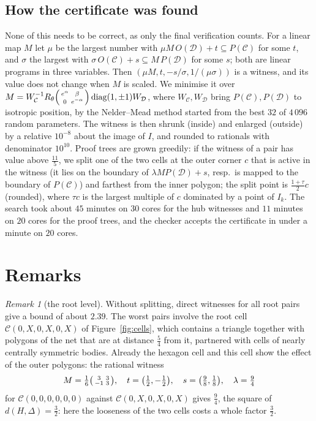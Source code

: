\documentclass[11pt]{amsart}
\theoremstyle{definition}
\theoremstyle{remark}
\newtheorem{remark}[theorem]{Remark}
\newcommand{\dBM}{d}
\newcommand{\C}{\mathcal C}
\newcommand{\D}{\mathcal D}
\begin{document}
\subsection{How the certificate was found}
None of this needs to be correct, as only the final verification counts. For a linear map $M$ let $\mu$ be the largest number
with $\mu M\,O(\D)+t\subseteq P(\C)$ for some $t$, and $\sigma$ the largest with $\sigma\,O(\C)+s\subseteq M\,P(\D)$ for some
$s$; both are linear programs in three variables. Then $(\mu M,t,-s/\sigma,1/(\mu\sigma))$ is a witness, and its value does not
change when $M$ is scaled. We minimise it over $M=W_\C^{-1}R_\theta\begin{psmallmatrix}e^\alpha&\beta\\0&e^{-\alpha}\end{psmallmatrix}
\operatorname{diag}(1,\pm1)W_\D$, where $W_\C,W_\D$ bring $P(\C),P(\D)$ to isotropic position, by the Nelder--Mead method started
from the best $32$ of $4\,096$ random parameters. The witness is then shrunk (inside) and enlarged (outside) by a relative
$10^{-8}$ about the image of $I$, and rounded to rationals with denominator $10^{10}$. Proof trees are grown greedily: if the witness
of a pair has value above $\frac{11}5$, we split one of the two cells at the outer corner $c$ that is active in the witness
(it lies on the boundary of $\lambda MP(\D)+s$, resp.\ is mapped to the boundary of $P(\C)$) and farthest from the inner
polygon; the split point is $\frac{1+\tau}2c$ (rounded), where $\tau c$ is the largest multiple of $c$ dominated by a point
of $I_k$. The search took about $45$ minutes on $30$ cores for the hub witnesses and $11$ minutes on $20$ cores for the proof trees, and the checker accepts the certificate in under a minute on $20$ cores.

\section{Remarks}

\begin{remark}[the root level]
Without splitting, direct witnesses for all root pairs give a bound of about $2.39$. The worst pairs involve the root cell
$\C(0,X,0,X,0,X)$ of Figure~\ref{fig:cells}, which contains a triangle together with polygons of the net that are at distance
$\frac54$ from it, partnered with cells of nearly centrally symmetric bodies. Already the hexagon cell and this cell show
the effect of the outer polygons: the rational witness
\[
  M=\tfrac16\begin{psmallmatrix}3&3\\-1&3\end{psmallmatrix},\quad t=\bigl(\tfrac12,-\tfrac12\bigr),\quad s=\bigl(\tfrac98,\tfrac18\bigr),\quad
  \lambda=\tfrac94
\]
for $\C(0,0,0,0,0,0)$ against $\C(0,X,0,X,0,X)$ gives $\frac94$, the square of $\dBM(H,\Delta)=\frac32$: here the looseness
of the two cells costs a whole factor $\frac32$.
\end{remark}
\end{document}
